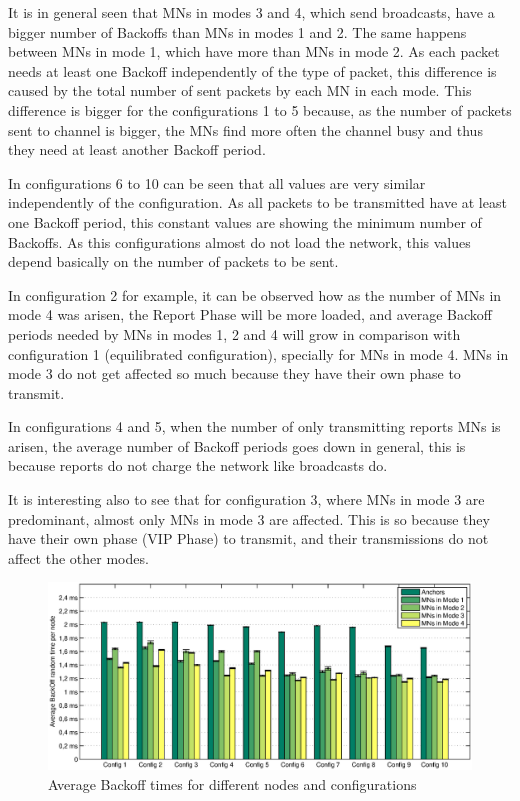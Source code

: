It is in general seen that \acp{MN} in modes 3 and 4, which send broadcasts, have a bigger number of Backoffs than \acp{MN} in modes 1 and 2. The same 
happens between \acp{MN} in mode 1, which have more than \acp{MN} in mode 2. As each packet needs at least one Backoff independently of the type of 
packet, this difference is caused by the total number of sent packets by each \ac{MN} in each mode. This difference is bigger for the configurations 1 
to 5 because, as the number of packets sent to channel is bigger, the \acp{MN} find more often the channel busy and thus they need at least another Backoff
period.

In configurations 6 to 10 can be seen that all values are very similar independently of the configuration. As all packets to be transmitted have at least
one Backoff period, this constant values are showing the minimum number of Backoffs. As this configurations almost do not load the network, this values 
depend basically on the number of packets to be sent.

In configuration 2 for example, it can be observed how as the number of \acp{MN} in mode 4 was arisen, the Report Phase will be more loaded, and average
Backoff periods needed by \acp{MN} in modes 1, 2 and 4 will grow in comparison with configuration 1 (equilibrated configuration), specially for \acp{MN} in
mode 4. \acp{MN} in mode 3 do not get affected so much because they have their own phase to transmit.

In configurations 4 and 5, when the number of only transmitting reports \acp{MN} is arisen, the average number of Backoff periods goes down in general,
this is because reports do not charge the network like broadcasts do.

It is interesting also to see that for configuration 3, where \acp{MN} in mode 3 are predominant, almost only \acp{MN} in mode 3 are affected. This is so
because they have their own phase (\ac{VIP} Phase) to transmit, and their transmissions do not affect the other modes.

\begin{figure}[ht]
 \begin{center}
  \includegraphics[width=1\textwidth]{averageBackoffTimeANandMN.eps}
 \end{center}
 \caption{Average Backoff times for different nodes and configurations}
 \label{fig:averageBackoffTimeANandMN}
\end{figure}

